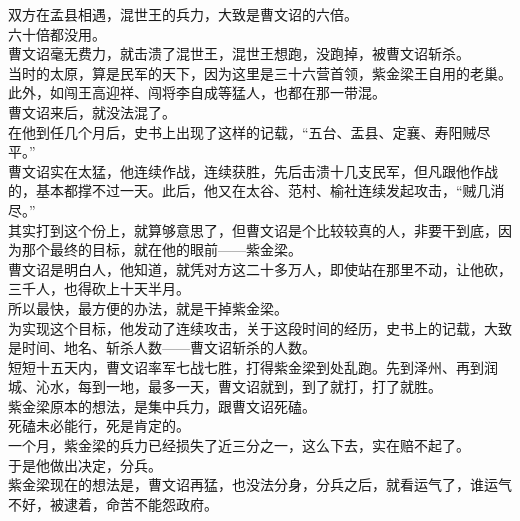 \begin{multicols}{\theparacolNo}
双方在孟县相遇，混世王的兵力，大致是曹文诏的六倍。\\

六十倍都没用。\\

曹文诏毫无费力，就击溃了混世王，混世王想跑，没跑掉，被曹文诏斩杀。\\

当时的太原，算是民军的天下，因为这里是三十六营首领，紫金梁王自用的老巢。此外，如闯王高迎祥、闯将李自成等猛人，也都在那一带混。\\

曹文诏来后，就没法混了。\\

在他到任几个月后，史书上出现了这样的记载，“五台、盂县、定襄、寿阳贼尽平。”\\

曹文诏实在太猛，他连续作战，连续获胜，先后击溃十几支民军，但凡跟他作战的，基本都撑不过一天。此后，他又在太谷、范村、榆社连续发起攻击，“贼几消尽。”\\

其实打到这个份上，就算够意思了，但曹文诏是个比较较真的人，非要干到底，因为那个最终的目标，就在他的眼前——紫金梁。\\

曹文诏是明白人，他知道，就凭对方这二十多万人，即使站在那里不动，让他砍，三千人，也得砍上十天半月。\\

所以最快，最方便的办法，就是干掉紫金梁。\\

为实现这个目标，他发动了连续攻击，关于这段时间的经历，史书上的记载，大致是时间、地名、斩杀人数——曹文诏斩杀的人数。\\

短短十五天内，曹文诏率军七战七胜，打得紫金梁到处乱跑。先到泽州、再到润城、沁水，每到一地，最多一天，曹文诏就到，到了就打，打了就胜。\\

紫金梁原本的想法，是集中兵力，跟曹文诏死磕。\\

死磕未必能行，死是肯定的。\\

一个月，紫金梁的兵力已经损失了近三分之一，这么下去，实在赔不起了。\\

于是他做出决定，分兵。\\

紫金梁现在的想法是，曹文诏再猛，也没法分身，分兵之后，就看运气了，谁运气不好，被逮着，命苦不能怨政府。\\


\end{multicols}
